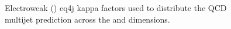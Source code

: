 \begin{figure}[!h]
{    } \\
     ~~
     ~~
    \caption{
        Electroweak (\ttw) eq4j kappa factors used to distribute
        the QCD multijet prediction across the \nb and \mht dimensions.
    }
    \label{fig:ewk_kappas_eq4j}
\end{figure}

